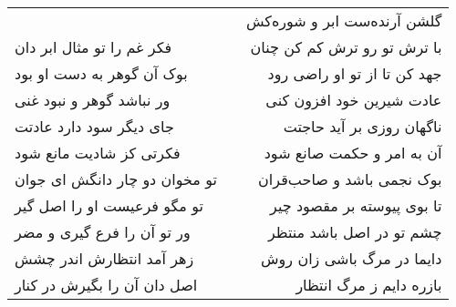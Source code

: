 \begin{center}
\begin{longtable}{l p{0.5cm} r}
&&
گلشن آرنده‌ست ابر و شوره‌کش
\\
فکر غم را تو مثال ابر دان
&&
با ترش تو رو ترش کم کن چنان
\\
بوک آن گوهر به دست او بود
&&
جهد کن تا از تو او راضی رود
\\
ور نباشد گوهر و نبود غنی
&&
عادت شیرین خود افزون کنی
\\
جای دیگر سود دارد عادتت
&&
ناگهان روزی بر آید حاجتت
\\
فکرتی کز شادیت مانع شود
&&
آن به امر و حکمت صانع شود
\\
تو مخوان دو چار دانگش ای جوان
&&
بوک نجمی باشد و صاحب‌قران
\\
تو مگو فرعیست او را اصل گیر
&&
تا بوی پیوسته بر مقصود چیر
\\
ور تو آن را فرع گیری و مضر
&&
چشم تو در اصل باشد منتظر
\\
زهر آمد انتظارش اندر چشش
&&
دایما در مرگ باشی زان روش
\\
اصل دان آن را بگیرش در کنار
&&
بازره دایم ز مرگ انتظار
\\
\end{longtable}
\end{center}
